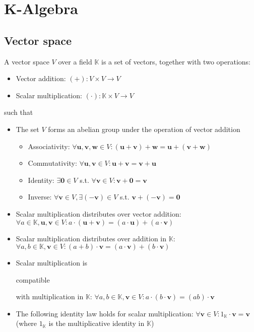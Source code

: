 \documentclass{article}
\newenvironment{itemized}{ 
\begin{itemize}
\setlength{\itemsep}{0pt}
\setlength{\parskip}{0pt}
\setlength{\parsep}{0pt}     
}{\end{itemize}}
\renewcommand{\vec}[1]{\mathbf{#1}}
\begin{document}
\section*{K-Algebra}

\subsection*{Vector space}

A vector space $V$ over a field $\mathbb{K}$ is a set of vectors, together with two operations:

  \begin{itemized}
    \item Vector addition: $(+) : V \times V \rightarrow V$
    \item Scalar multiplication: $(\cdot) : \mathbb{K} \times V \rightarrow V$
  \end{itemized}

\noindent such that 
  
  \begin{itemized}
    \item The set $V$ forms an abelian group under the operation of vector addition
      \begin{itemized}
        \item Associativity: $ \forall \vec{u}, \vec{v}, \vec{w} \in V : (\vec{u} + \vec{v}) + \vec{w} = \vec{u} + (\vec{v} + \vec{w}) $
        \item Commutativity: $ \forall \vec{u}, \vec{v} \in V : \vec{u} + \vec{v} = \vec{v} + \vec{u} $
        \item Identity: $ \exists \vec{0} \in V $ s.t. $ \forall \vec{v} \in V : \vec{v} + \vec{0} = \vec{v} $
        \item Inverse: $ \forall \vec{v} \in V, \exists \vec{(-v)} \in V $ s.t. $ \vec{v} + \vec{(-v)} = \vec{0} $
      \end{itemized}
    \item Scalar multiplication distributes over vector addition: $ \forall a \in \mathbb{K}, \vec{u}, \vec{v} \in V : a \cdot (\vec{u} + \vec{v}) = (a \cdot \vec{u}) + (a \cdot \vec{v}) $
    \item Scalar multiplication distributes over addition in $\mathbb{K}$: $ \forall a, b \in \mathbb{K}, \vec{v} \in V : (a + b) \cdot \vec{v} = (a \cdot \vec{v}) + (b \cdot \vec{v}) $
    \item Scalar multiplication is \begin{em}compatible\end{em} with multiplication in $\mathbb{K}$: $ \forall a,b \in \mathbb{K}, \vec{v} \in V : a \cdot (b \cdot \vec{v}) = (ab) \cdot \vec{v} $ 
    \item The following identity law holds for scalar multiplication: $ \forall \vec{v} \in V : 1_{\mathbb{K}} \cdot \vec{v} = \vec{v} $ (where $1_{\mathbb{K}}$ is the multiplicative identity in $\mathbb{K}$)
  \end{itemized}
\end{document}
